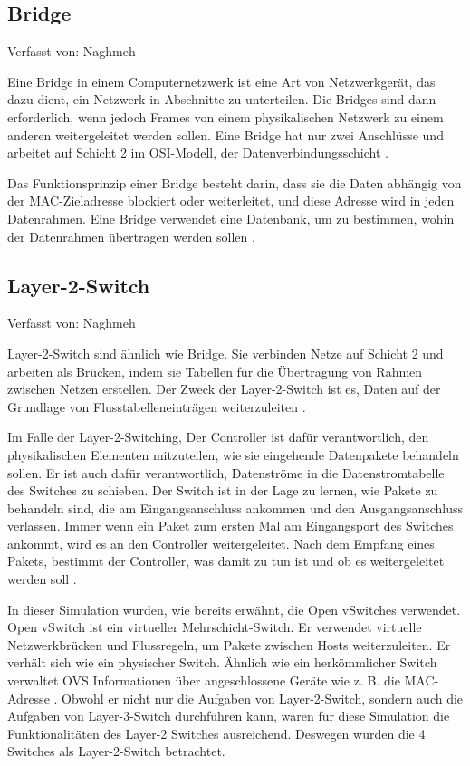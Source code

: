 \documentclass[fontsize=12pt,paper=a4,open=any,parskip=half,
  twoside=false,toc=listof,toc=bibliography,fleqn,leqno,
  captions=nooneline,captions=tableabove,british]{scrbook}
\begin{document}
\subsection{Bridge}
{\tiny Verfasst von: Naghmeh\par}
Eine Bridge in einem Computernetzwerk ist eine Art von Netzwerkgerät, das dazu dient, ein Netzwerk in Abschnitte zu unterteilen. Die Bridges sind dann erforderlich, wenn jedoch Frames von einem physikalischen Netzwerk zu einem anderen weitergeleitet werden sollen. Eine Bridge hat nur zwei Anschlüsse und  arbeitet auf Schicht 2 im OSI-Modell, der Datenverbindungsschicht \cite{baun2019grundlagen}.\par
Das Funktionsprinzip einer Bridge besteht darin, dass sie die Daten abhängig von der MAC-Zieladresse blockiert oder weiterleitet, und diese Adresse wird in jeden Datenrahmen. Eine Bridge verwendet eine Datenbank, um zu bestimmen, wohin der Datenrahmen übertragen werden sollen \cite{networkdevices}.

\subsection{Layer-2-Switch}
{\tiny Verfasst von: Naghmeh\par}
Layer-2-Switch sind ähnlich wie Bridge. Sie verbinden Netze auf Schicht 2 und arbeiten als Brücken, indem sie Tabellen für die Übertragung von Rahmen zwischen Netzen erstellen. Der Zweck der Layer-2-Switch ist es, Daten auf der Grundlage von Flusstabelleneinträgen weiterzuleiten \cite{networkdevices}.\par
Im Falle der Layer-2-Switching, Der Controller ist dafür verantwortlich, den physikalischen Elementen mitzuteilen, wie sie eingehende Datenpakete behandeln sollen. Er ist auch dafür verantwortlich, Datenströme in die Datenstromtabelle des Switches zu schieben. Der Switch ist in der Lage zu lernen, wie Pakete zu behandeln sind, die am Eingangsanschluss ankommen und den Ausgangsanschluss verlassen. Immer wenn ein Paket zum ersten Mal am Eingangsport des Switches ankommt, wird es an den Controller weitergeleitet. Nach dem Empfang eines Pakets, bestimmt der Controller, was damit zu tun ist und ob es weitergeleitet werden soll \cite{7840116}.\par
In dieser Simulation wurden, wie bereits erwähnt, die Open vSwitches verwendet. Open vSwitch ist ein virtueller Mehrschicht-Switch. Er verwendet virtuelle Netzwerkbrücken und Flussregeln, um Pakete zwischen Hosts weiterzuleiten. Er verhält sich wie ein physischer Switch. Ähnlich wie ein herkömmlicher Switch verwaltet OVS Informationen über angeschlossene Geräte wie z. B. die MAC-Adresse \cite{openvswitch1}. Obwohl er nicht nur die Aufgaben von Layer-2-Switch, sondern auch die Aufgaben von Layer-3-Switch durchführen kann, waren für diese Simulation die Funktionalitäten  des Layer-2 Switches ausreichend. Deswegen wurden die 4 Switches als Layer-2-Switch betrachtet.
\end{document}
